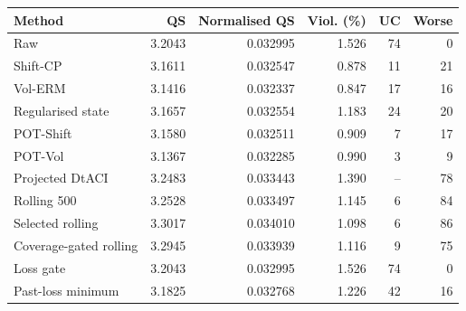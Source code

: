 \begin{tabular}{lrrrrr}
\toprule
Method & QS & Normalised QS & Viol. (\%) & UC & Worse \\
\midrule
Raw & 3.2043 & 0.032995 & 1.526 & 74 & 0 \\
Shift-CP & 3.1611 & 0.032547 & 0.878 & 11 & 21 \\
Vol-ERM & 3.1416 & 0.032337 & 0.847 & 17 & 16 \\
Regularised state & 3.1657 & 0.032554 & 1.183 & 24 & 20 \\
POT-Shift & 3.1580 & 0.032511 & 0.909 & 7 & 17 \\
POT-Vol & 3.1367 & 0.032285 & 0.990 & 3 & 9 \\
Projected DtACI & 3.2483 & 0.033443 & 1.390 & -- & 78 \\
Rolling 500 & 3.2528 & 0.033497 & 1.145 & 6 & 84 \\
Selected rolling & 3.3017 & 0.034010 & 1.098 & 6 & 86 \\
Coverage-gated rolling & 3.2945 & 0.033939 & 1.116 & 9 & 75 \\
Loss gate & 3.2043 & 0.032995 & 1.526 & 74 & 0 \\
Past-loss minimum & 3.1825 & 0.032768 & 1.226 & 42 & 16 \\
\bottomrule
\end{tabular}
